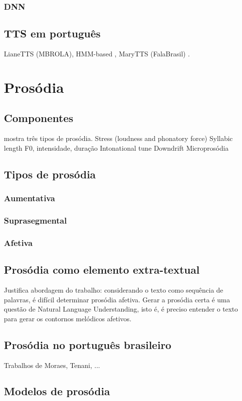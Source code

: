 \subsubsection{DNN}
\subsection{TTS em português}
LianeTTS (MBROLA), HMM-based \cite{couto}, MaryTTS (FalaBrasil) \cite{falabrasil}.
\section{Prosódia}
\subsection{Componentes}
 mostra três tipos de prosódia.
Stress (loudness and phonatory force)
Syllabic length
F0, intensidade, duração
Intonational tune
Downdrift
Microprosódia
\subsection{Tipos de prosódia}
\subsubsection{Aumentativa}
\subsubsection{Suprasegmental}
\subsubsection{Afetiva}
\subsection{Prosódia como elemento extra-textual}
Justifica abordagem do trabalho: considerando o texto como sequência de
palavras, é difícil determinar prosódia afetiva. Gerar a prosódia certa é uma
questão de Natural Language Understanding, isto é, é preciso entender o texto
para gerar os contornos melódicos afetivos.
\subsection{Prosódia no português brasileiro}
Trabalhos de Moraes, Tenani, ...
\subsection{Modelos de prosódia}
